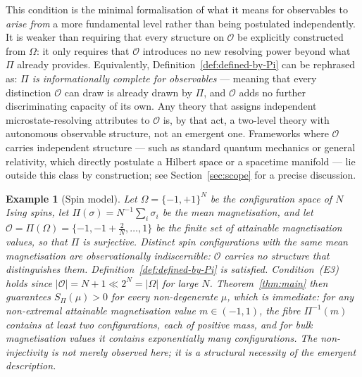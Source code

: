 \documentclass[12pt,a4paper]{article}
\newtheorem{example}[theorem]{Example}
\begin{document}
  This condition is the minimal formalisation of what it means for observables
  to \emph{arise from} a more fundamental level rather than being postulated
  independently.
  It is weaker than requiring that every structure on $\mathcal{O}$ be
  explicitly constructed from $\Omega$: it only requires that $\mathcal{O}$
  introduces no new resolving power beyond what $\Pi$ already provides.
  Equivalently, Definition~\ref{def:defined-by-Pi} can be rephrased as:
  \emph{$\Pi$ is informationally complete for observables} --- meaning that
  every distinction $\mathcal{O}$ can draw is already drawn by $\Pi$, and
  $\mathcal{O}$ adds no further discriminating capacity of its own.
  Any theory that assigns independent microstate-resolving attributes to
  $\mathcal{O}$ is, by that act, a two-level theory with autonomous observable
  structure, not an emergent one.
  Frameworks where $\mathcal{O}$ carries independent structure --- such as
  standard quantum mechanics or general relativity, which directly postulate
  a Hilbert space or a spacetime manifold --- lie outside this class by
  construction; see Section~\ref{sec:scope} for a precise discussion.

  \begin{example}[Spin model]
    \label{ex:spin}
    Let $\Omega = \{-1,+1\}^N$ be the configuration space of $N$ Ising spins, let
    $\Pi(\sigma) = N^{-1}\sum_i \sigma_i$ be the mean magnetisation, and let
    $\mathcal{O} = \Pi(\Omega) = \{-1, -1+\tfrac{2}{N}, \ldots, 1\}$ be the finite set of attainable
    magnetisation values, so that $\Pi$ is surjective.
    Distinct spin configurations with the same mean magnetisation are
    observationally indiscernible: $\mathcal{O}$ carries no structure that
    distinguishes them.
    Definition~\ref{def:defined-by-Pi} is satisfied.
    Condition~(E3) holds since $|\mathcal{O}| = N+1 \ll 2^N = |\Omega|$ for large $N$.
    Theorem~\ref{thm:main} then guarantees $S_\Pi(\mu) > 0$ for every non-degenerate $\mu$, which is immediate:
    for any non-extremal attainable magnetisation value $m \in (-1,1)$, the fibre $\Pi^{-1}(m)$ contains at
    least two configurations, each of positive mass, and for bulk magnetisation values it contains
    exponentially many configurations.
    The non-injectivity is not merely observed here; it is a structural
    necessity of the emergent description.
  \end{example}
\end{document}
